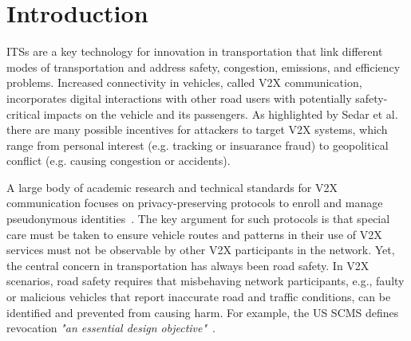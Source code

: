 \section{Introduction}

\acp{ITS} are a key technology for innovation in transportation that link
different modes of transportation and address safety, congestion, emissions,
and efficiency problems. Increased connectivity in vehicles, called \ac{V2X}
communication, incorporates digital interactions with other road users with
potentially safety-critical impacts on the vehicle and its passengers.
As highlighted by Sedar et al.~\cite{sedar2023v2x_survey} there are many
possible incentives for attackers to target \ac{V2X} systems, which range from
personal interest (e.g. tracking or insuarance fraud) to geopolitical
conflict (e.g. causing congestion or accidents).

A large body of academic research and technical standards for \ac{V2X}
communication focuses on privacy-preserving protocols to enroll and manage
pseudonymous
identities~\cite{whitefield2017privacy,desmoulins2019practical,larsen2021daa,etsi2021102940,etsi2022102941,brecht2018scms}.
The key argument for such protocols is that special care must
be taken to ensure vehicle routes and patterns in their use of \ac{V2X}
services must not be observable by other
\ac{V2X} participants in the network.
Yet,
the central concern in transportation has always been road safety.
In \ac{V2X} scenarios, road safety requires that
misbehaving network participants, e.g., faulty or malicious vehicles
that report inaccurate road and traffic conditions, can be identified and
prevented from causing harm. For example, the US \ac{SCMS} defines revocation
\emph{"an essential design objective"}~\cite{brecht2018scms}.

